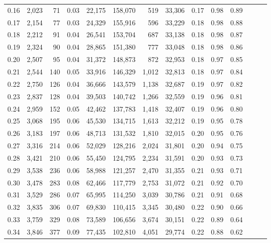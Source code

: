 \begin{tabular}{rrrrrrrrrrrrrr}
0.16 &  2,023 &   71 &  0.03 &   22,175 &  158,070 &     519 &  33,306 &  0.17 &  0.98 &      0.89 \\
0.17 &  2,154 &   77 &  0.03 &   24,329 &  155,916 &     596 &  33,229 &  0.18 &  0.98 &      0.88 \\
0.18 &  2,212 &   91 &  0.04 &   26,541 &  153,704 &     687 &  33,138 &  0.18 &  0.98 &      0.87 \\
0.19 &  2,324 &   90 &  0.04 &   28,865 &  151,380 &     777 &  33,048 &  0.18 &  0.98 &      0.86 \\
0.20 &  2,507 &   95 &  0.04 &   31,372 &  148,873 &     872 &  32,953 &  0.18 &  0.97 &      0.85 \\
0.21 &  2,544 &  140 &  0.05 &   33,916 &  146,329 &   1,012 &  32,813 &  0.18 &  0.97 &      0.84 \\
0.22 &  2,750 &  126 &  0.04 &   36,666 &  143,579 &   1,138 &  32,687 &  0.19 &  0.97 &      0.82 \\
0.23 &  2,837 &  128 &  0.04 &   39,503 &  140,742 &   1,266 &  32,559 &  0.19 &  0.96 &      0.81 \\
0.24 &  2,959 &  152 &  0.05 &   42,462 &  137,783 &   1,418 &  32,407 &  0.19 &  0.96 &      0.80 \\
0.25 &  3,068 &  195 &  0.06 &   45,530 &  134,715 &   1,613 &  32,212 &  0.19 &  0.95 &      0.78 \\
0.26 &  3,183 &  197 &  0.06 &   48,713 &  131,532 &   1,810 &  32,015 &  0.20 &  0.95 &      0.76 \\
0.27 &  3,316 &  214 &  0.06 &   52,029 &  128,216 &   2,024 &  31,801 &  0.20 &  0.94 &      0.75 \\
0.28 &  3,421 &  210 &  0.06 &   55,450 &  124,795 &   2,234 &  31,591 &  0.20 &  0.93 &      0.73 \\
0.29 &  3,538 &  236 &  0.06 &   58,988 &  121,257 &   2,470 &  31,355 &  0.21 &  0.93 &      0.71 \\
0.30 &  3,478 &  283 &  0.08 &   62,466 &  117,779 &   2,753 &  31,072 &  0.21 &  0.92 &      0.70 \\
0.31 &  3,529 &  286 &  0.07 &   65,995 &  114,250 &   3,039 &  30,786 &  0.21 &  0.91 &      0.68 \\
0.32 &  3,835 &  306 &  0.07 &   69,830 &  110,415 &   3,345 &  30,480 &  0.22 &  0.90 &      0.66 \\
0.33 &  3,759 &  329 &  0.08 &   73,589 &  106,656 &   3,674 &  30,151 &  0.22 &  0.89 &      0.64 \\
0.34 &  3,846 &  377 &  0.09 &   77,435 &  102,810 &   4,051 &  29,774 &  0.22 &  0.88 &      0.62 \\

\end{tabular}
